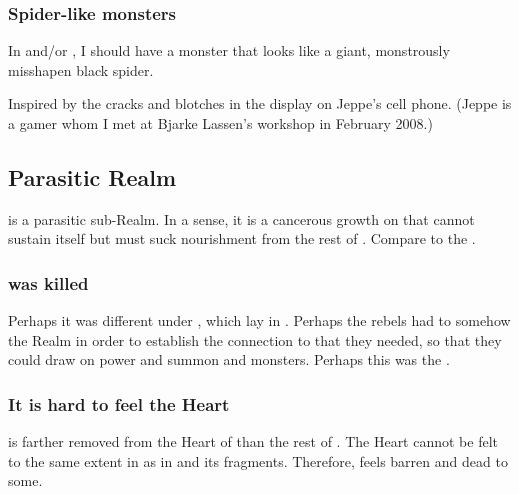 \subsubsection{Spider-like monsters}
In \Nyx{} and/or \Erebos, I should have a monster that looks like a giant, monstrously misshapen black spider. 

Inspired by the cracks and blotches in the display on Jeppe's cell phone. (Jeppe is a gamer whom I met at Bjarke Lassen's workshop in February 2008.) 


















\subsection{Parasitic Realm}
\Nyx{} is a parasitic sub-Realm. 
In a sense, it is a cancerous growth on \Miith{} that cannot sustain itself but must suck nourishment from the rest of \Miith{}. 
Compare to the . 





\subsubsection{\Nyx{} was killed}
Perhaps it was different under , which lay in \Nyx. 
Perhaps the rebels had to somehow  the Realm in order to establish the connection to \Erebos{} that they needed, so that they could draw on \Erebean{} power and summon \banes{} and monsters. 
Perhaps this was the . 




\subsubsection{It is hard to feel the Heart}
\Nyx{} is farther removed from the Heart of \Miith{} than the rest of \Miith{}. 
The Heart cannot be felt to the same extent in \Nyx{} as in  and its fragments. 
Therefore, \Nyx{} feels barren and dead to some. 

